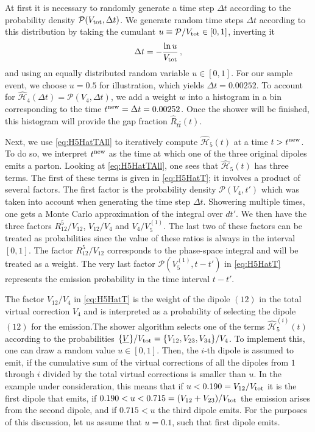 \documentclass[11pt,a4paper]{article}
\begin{document}
At first it is necessary to randomly generate a time step $\Delta t$ according to the  probability density $\mathcal{ P} (V_{{\rm tot}},\Delta t)$. We generate random time steps $\Delta t$ according to this distribution by taking the cumulant $u \equiv \mathcal{P}/V_{{\rm tot}}\in[0,1]$, inverting it
\begin{align}
\Delta t=-\frac{\ln u}{V_{{\rm tot}}}\, ,
\end{align}
and using an equally distributed random variable $u\in [0,1]$.
For our sample event, we choose $u=0.5$ for illustration, which yields $\Delta t = 0.00252$. To account for $\mathcal{\hat{H}}_4(\Delta t) = \mathcal{ P} (V_4,\Delta t)$, we add a weight $w$ into a histogram in a bin corresponding to the  time $t^{{\rm new}} = \Delta t= 0.00252$. Once the shower will be finished, this histogram will provide the gap fraction $\hat{R}_{t\bar{t}}(t)$. 

Next, we use \eqref{eq:H5HatTAll} to iteratively compute $\mathcal{\hat{H}}_5(t)$ at a time $t>t^{{\rm new}}$. To do so, we interpret $t^{{\rm new}}$ as the time at which one of the three original dipoles emits a parton. Looking at \eqref{eq:H5HatTAll}, one sees that $\mathcal{\hat{H}}_5(t)$ has three terms. 
The first of these terms is given in \eqref{eq:H5HatT}; it involves a product of several factors. The first factor is the probability density $\mathcal{P}(V_4,t')$ which was taken into account when generating the time step $\Delta t$. Showering multiple times, one gets a Monte Carlo approximation of the integral over $dt'$. We then have the three factors ${R_{12}^5}/{V_{12}}$, ${V_{12}}/{V_4}$ and $V_4/ V_5^{(1)}$.  The last two of these factors  can be treated as probabilities since the value of these ratios is always in the interval $[0,1]$. The factor ${R_{12}^5}/{V_{12}}$ corresponds to the phase-space integral and will be treated as a weight. The very last factor $\mathcal{P}( V_5^{(1)} ,t-t')$ in \eqref{eq:H5HatT}  represents the emission probability in the time interval $t-t'$.  

The factor $V_{12}/V_4$ in \eqref{eq:H5HatT} is the weight of the dipole $(12)$ in the total virtual correction $V_4$ and is interpreted as a probability of selecting the dipole $(12)$ for the emission.The shower algorithm selects one of the terms $\mathcal{\hat{H}}^{(i)}_5(t)$ according to the probabilities $\{\underline{V}\}/V_{\rm tot} = \{ V_{12}, V_{23},V_{34}\} / V_4$. To implement this, one can draw a random value $u\in[0,1]$. Then, the $i$-th dipole is assumed to emit, if the cumulative sum of the virtual corrections of all the dipoles from $1$ through $i$ divided by the total virtual corrections is smaller than $u$. In the example under consideration, this means that if $u<0.190=V_{12}/V_{{\rm tot}}$ it is the first dipole that emits, if $0.190<u<0.715=(V_{12}+V_{23})/V_{{\rm tot}}$ the emission arises from the second dipole, and if $0.715<u$ the third dipole emits. For the purposes of this discussion, let us assume  that $u=0.1$, such that first dipole emits.
\end{document}
